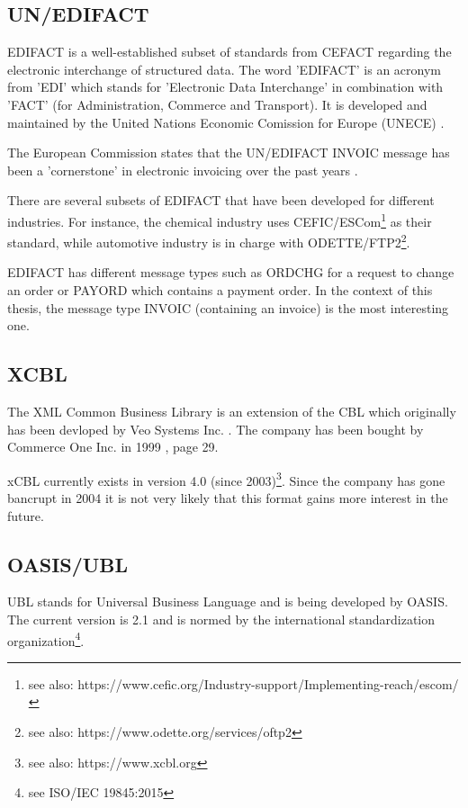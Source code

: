 \subsection{UN/EDIFACT}
\label{sec2.1.1}

EDIFACT is a well-established \cite{basware} subset of standards from CEFACT regarding the electronic interchange of structured data. The word 'EDIFACT' is an acronym from 'EDI' which stands for 'Electronic Data Interchange' in combination with 'FACT' (for Administration, Commerce and Transport). It is developed and maintained by the United Nations Economic Comission for Europe (UNECE) \cite{unece}.

The European Commission states that the UN/EDIFACT INVOIC message has been a 'cornerstone' in electronic invoicing over the past years \cite[page 14]{ec12}.

There are several subsets of EDIFACT that have been developed for different industries. For instance, the chemical industry uses CEFIC/ESCom\footnote{see also: https://www.cefic.org/Industry-support/Implementing-reach/escom/} as their standard, while automotive industry is in charge with ODETTE/FTP2\footnote{see also: https://www.odette.org/services/oftp2}.

EDIFACT has different message types such as ORDCHG for a request to change an order or PAYORD which contains a payment order. In the context of this thesis, the message type INVOIC (containing an invoice) is the most interesting one.

\subsection{XCBL}
\label{sec2.1.2}

The XML Common Business Library is an extension of the CBL which originally has been devloped by Veo Systems Inc. \cite{coverpages}. The company has been bought by Commerce One Inc. in 1999 \cite{co}, page 29. 

xCBL currently exists in version 4.0 (since 2003)\footnote{see also: https://www.xcbl.org}. Since the company has gone bancrupt in 2004 \cite{scm} it is not very likely that this format gains more interest in the future.

\subsection{OASIS/UBL}
\label{sec2.1.3}

UBL stands for Universal Business Language and is being developed by OASIS. The current version is 2.1 and is normed by the international standardization organization\footnote{see ISO/IEC 19845:2015}.

